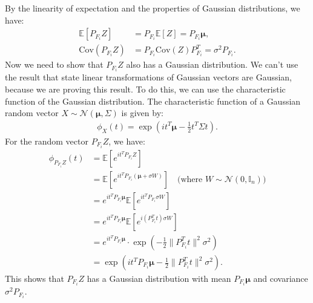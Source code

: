 \documentclass[a4paper, 12pt]{article}
\begin{document}
    \begin{answerenum}
        \item By the linearity of expectation and the properties of Gaussian distributions, we have:
            \begin{align*}
                \mathbb{E}[P_{F_i}Z] &= P_{F_i}\mathbb{E}[Z] = P_{F_i}\boldsymbol{\mu}, \\
                \text{Cov}(P_{F_i}Z) &= P_{F_i}\text{Cov}(Z)P_{F_i}^T = \sigma^2P_{F_i}.
            \end{align*}
            Now we need to show that $P_{F_i}Z$ also has a Gaussian distribution. We can't use the result that state linear transformations of Gaussian vectors are Gaussian, because we are proving this result.
            To do this, we can use the characteristic function of the Gaussian distribution. The characteristic function of a Gaussian random vector $X \sim \mathcal{N}(\boldsymbol{\mu}, \Sigma)$ is given by:
            \begin{align*}
                \phi_X(t) = \exp\left( i t^T \boldsymbol{\mu} - \frac{1}{2} t^T \Sigma t \right).
            \end{align*}
            For the random vector $P_{F_i}Z$, we have:
            \begin{align*}
                \phi_{P_{F_i}Z}(t) &= \mathbb{E}\left[ e^{i t^T P_{F_i}Z} \right] \\
                &= \mathbb{E}\left[ e^{i t^T P_{F_i}(\boldsymbol{\mu} + \sigma W)} \right] \quad \text{(where $W \sim \mathcal{N}(0, \mathbb{I}_n)$)} \\
                &= e^{i t^T P_{F_i}\boldsymbol{\mu}} \mathbb{E}\left[ e^{i t^T P_{F_i}\sigma W} \right] \\
                &= e^{i t^T P_{F_i}\boldsymbol{\mu}} \mathbb{E}\left[ e^{i (P_{F_i}^T t) \sigma W} \right] \\
                &= e^{i t^T P_{F_i}\boldsymbol{\mu}} \cdot \exp\left( -\frac{1}{2} \|P_{F_i}^T t\|^2 \sigma^2 \right) \\
                &= \exp\left( i t^T P_{F_i}\boldsymbol{\mu} - \frac{1}{2} \|P_{F_i}^T t\|^2 \sigma^2 \right).
            \end{align*}
            This shows that $P_{F_i}Z$ has a Gaussian distribution with mean $P_{F_i}\boldsymbol{\mu}$ and covariance $\sigma^2P_{F_i}$.


\end{answerenum}
\end{document}
